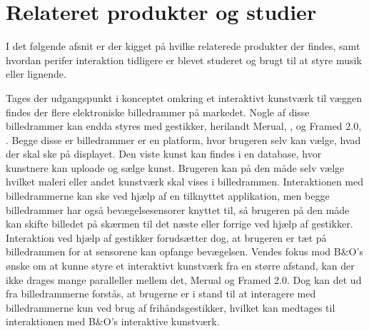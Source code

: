 \section{Relateret produkter og studier}
\label{RelateretProdukterOgStudier}

I det følgende afsnit er der kigget på hvilke relaterede produkter der findes, samt hvordan perifer interaktion tidligere er blevet studeret og brugt til at styre musik eller lignende.

Tages der udgangspunkt i konceptet omkring et interaktivt kunstværk til væggen findes der flere elektroniske billedrammer på markedet. Nogle af disse billedrammer kan endda styres med gestikker, herilandt Merual, \parencite{WEB:Meural}, og Framed 2.0, \parencite{WEB:Framed2.0}. Begge disse er billedrammer er en platform, hvor brugeren selv kan vælge, hvad der skal ske på displayet. Den viste kunst kan findes i en database, hvor kunstnere kan uploade og sælge kunst. Brugeren kan på den måde selv vælge hvilket maleri eller andet kunstværk skal vises i billedrammen. Interaktionen med billedrammerne kan ske ved hjælp af en tilknyttet applikation, men begge billedrammer har også bevægelsesensorer knyttet til, så brugeren på den måde kan skifte billedet på skærmen til det næste eller forrige ved hjælp af gestikker. Interaktion ved hjælp af gestikker forudsætter dog, at brugeren er tæt på billedrammen for at sensorene kan opfange bevægelsen. Vendes fokus mod B$\&$O's ønske om at kunne styre et interaktivt kunstværk fra en større afstand, kan der ikke drages mange paralleller mellem det, Merual og Framed 2.0. Dog kan det ud fra billedrammerne forstås, at brugerne er i stand til at interagere med billedrammerne kun ved brug af frihåndsgestikker, hvilket kan medtages til interaktionen med B$\&$O's interaktive kunstværk.


